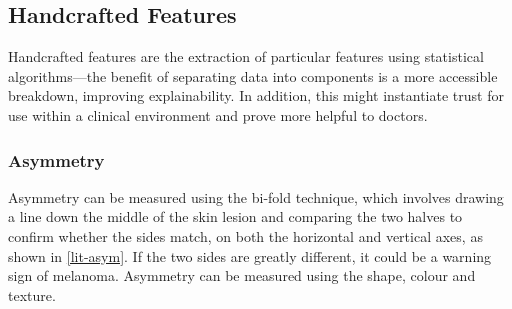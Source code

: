 \subsection{Handcrafted Features}
Handcrafted features are the extraction of particular features using statistical algorithms—the benefit of separating data into components is a more accessible breakdown, improving explainability. In addition, this might instantiate trust for use within a clinical environment and prove more helpful to doctors.

\subsubsection{Asymmetry}
Asymmetry can be measured using the bi-fold technique, which involves drawing a line down the middle of the skin lesion and comparing the two halves to confirm whether the sides match, on both the horizontal and vertical axes, as shown in \ref{lit-asym}. If the two sides are greatly different, it could be a warning sign of melanoma. Asymmetry can be measured using the shape\cite{Zaqout2016}, colour\cite{Kasmi2016} and texture\cite{Ali2020a}.

